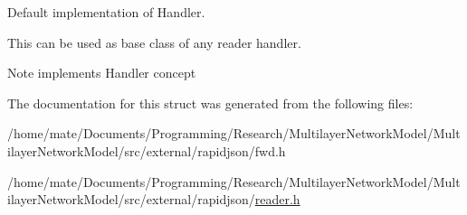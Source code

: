 Default implementation of Handler. 

This can be used as base class of any reader handler. \begin{DoxyNote}{Note}
implements Handler concept 
\end{DoxyNote}


The documentation for this struct was generated from the following files\+:\begin{DoxyCompactItemize}
\item 
/home/mate/\+Documents/\+Programming/\+Research/\+Multilayer\+Network\+Model/\+Multilayer\+Network\+Model/src/external/rapidjson/fwd.\+h\item 
/home/mate/\+Documents/\+Programming/\+Research/\+Multilayer\+Network\+Model/\+Multilayer\+Network\+Model/src/external/rapidjson/\hyperlink{reader_8h}{reader.\+h}\end{DoxyCompactItemize}
